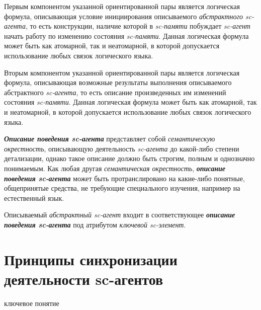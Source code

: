 Первым компонентом указанной ориентированной пары является логическая формула, описывающая условие инициирования описываемого \textit{абстрактного sc-агента}, то есть конструкции, наличие которой в \textit{sc-памяти} побуждает \textit{sc-агент} начать работу по изменению состояния \textit{sc-памяти}. Данная логическая формула может быть как атомарной, так и неатомарной, в которой допускается использование любых связок логического языка.

Вторым компонентом указанной ориентированной пары является логическая формула, описывающая возможные результаты выполнения описываемого абстрактного \textit{sc-агента}, то есть описание произведенных им изменений состояния \textit{sc-памяти}. Данная логическая формула может быть как атомарной, так и неатомарной, в которой допускается использование любых связок логического языка.

\begin{SCn}
\end{SCn}

\textbf{\textit{Описание поведения sc-агента}} представляет собой \textit{семантическую окрестность}, описывающую деятельность \textit{sc-агента} до какой-либо степени детализации, однако такое описание должно быть строгим, полным и однозначно понимаемым. Как любая другая \textit{семантическая окрестность}, \textbf{\textit{описание поведения sc-агента}} может быть протранслировано на какие-либо понятные, общепринятые средства, не требующие специального изучения, например на естественный язык.

Описываемый \textit{абстрактный sc-агент} входит в соответствующее \textbf{\textit{описание поведения sc-агента}} под атрибутом \textit{ключевой sc-элемент\scnrolesign}.

\section{Принципы синхронизации деятельности sc-агентов}
\label{sec_ps_sync}

\begin{SCn}
\begin{scnrelfromlist}{ключевое понятие}
\end{scnrelfromlist}
\end{SCn}

